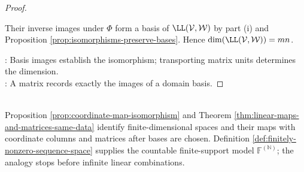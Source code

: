 \begin{theorem}
\begin{proof}
\begin{enumerate}[label=(\roman*)]
Their inverse images under $\Phi$ form a basis of $\LL(\mathcal{V},\mathcal{W})$ by part (i) and Proposition \ref{prop:isomorphisms-preserve-bases}. Hence $\dim(\LL(\mathcal{V},\mathcal{W}))=mn$.
\end{enumerate}
: Basis images establish the isomorphism; transporting matrix units determines the dimension.\\
: A matrix records exactly the images of a domain basis.
\end{proof}
\end{theorem}

\begin{perspective} \label{per:finite-support-coordinate-model} \\
Proposition \ref{prop:coordinate-map-isomorphism} and Theorem \ref{thm:linear-maps-and-matrices-same-data} identify finite-dimensional spaces and their maps with coordinate columns and matrices after bases are chosen. Definition \ref{def:finitely-nonzero-sequence-space} supplies the countable finite-support model $\mathbb{F}^{(\mathbb{N})}$; the analogy stops before infinite linear combinations.
\end{perspective}

